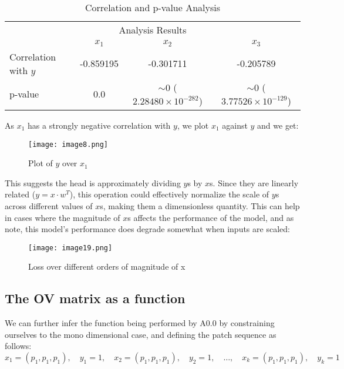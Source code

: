 \documentclass{article}
\begin{document}
\begin{table}[htbp]
  \caption{Correlation and p-value Analysis}  %
  \label{correlation-table}  %
  \centering
  \begin{tabular}{lccc}  %
    \toprule
    \multicolumn{4}{c}{Analysis Results} \\  %
    \cmidrule(r){1-4}  %
    & $x_1$ & $x_2$ & $x_3$ \\  %
    \midrule
    Correlation with $y$ & -0.859195 & -0.301711 & -0.205789 \\
    p-value & 0.0 & $\sim 0$ ($2.28480 \times 10^{-282}$) & $\sim 0$ ($3.77526 \times 10^{-129}$) \\
    \bottomrule
  \end{tabular}
\end{table}
As $x_1$ has a strongly negative correlation with $y$, we plot $x_1$ against $y$ and we get:

\begin{figure}[htbp]
\centering
\texttt{[image: image8.png]}
\caption{Plot of $y$ over $x_1$}
\end{figure}

\newpage

This suggests the head is approximately dividing $y$s by $x$s. Since they are linearly related ($y = x \cdot w^T$), this operation could effectively normalize the scale of $y$s across different values of $x$s, making them a dimensionless quantity. This can help in cases where the magnitude of $x$s affects the performance of the model, and as \citep{garg_2023_what} note, this model's performance does degrade somewhat when inputs are scaled:

\begin{figure}[htbp]
\centering
\texttt{[image: image19.png]}
\caption{Loss over different orders of magnitude of x}
\end{figure}

\subsection{The OV matrix as a function}
We can further infer the function being performed by A0.0 by constraining ourselves to the mono dimensional case, and defining the patch sequence as follows:
\[
x_1 = (p_1, p_1, p_1), \quad y_1 = 1, \quad x_2 = (p_1, p_1, p_1), \quad y_2 = 1, \quad \ldots, \quad x_k = (p_1, p_1, p_1), \quad y_k = 1
\]
\end{document}
